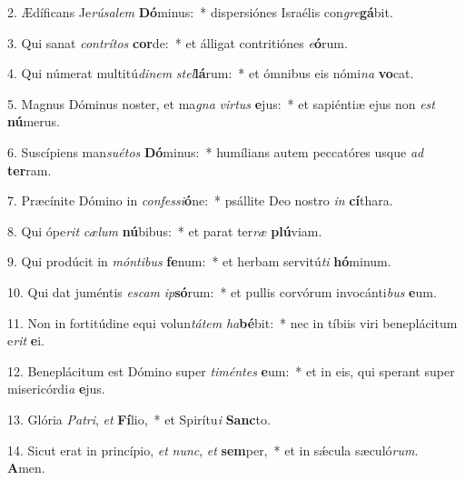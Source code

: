 2. Ædíficans Je\textit{rú}\textit{sa}\textit{lem} \textbf{Dó}minus:~*  dispersiónes Israélis con\textit{gre}\textbf{gá}bit.\

3. Qui sanat \textit{con}\textit{trí}\textit{tos} \textbf{cor}de:~*  et álligat contritiónes \textit{e}\textbf{ó}rum.\

4. Qui númerat multitú\textit{di}\textit{nem} \textit{stel}\textbf{lá}rum:~*  et ómnibus eis nómi\textit{na} \textbf{vo}cat.\

5. Magnus Dóminus noster, et ma\textit{gna} \textit{vir}\textit{tus} \textbf{e}jus:~*  et sapiéntiæ ejus non \textit{est} \textbf{nú}merus.\

6. Suscípiens man\textit{su}\textit{é}\textit{tos} \textbf{Dó}minus:~*  humílians autem peccatóres usque \textit{ad} \textbf{ter}ram.\

7. Præcínite Dómino in \textit{con}\textit{fes}\textit{si}\textbf{ó}ne:~*  psállite Deo nostro \textit{in} \textbf{cí}thara.\

8. Qui ópe\textit{rit} \textit{cæ}\textit{lum} \textbf{nú}bibus:~*  et parat ter\textit{ræ} \textbf{plú}viam.\

9. Qui prodúcit in \textit{món}\textit{ti}\textit{bus} \textbf{fe}num:~*  et herbam servitú\textit{ti} \textbf{hó}minum.\

10. Qui dat juméntis \textit{es}\textit{cam} \textit{ip}\textbf{só}rum:~*  et pullis corvórum invocánti\textit{bus} \textbf{e}um.\

11. Non in fortitúdine equi volun\textit{tá}\textit{tem} \textit{ha}\textbf{bé}bit:~*  nec in tíbiis viri beneplácitum e\textit{rit} \textbf{e}i.\

12. Beneplácitum est Dómino super \textit{ti}\textit{mén}\textit{tes} \textbf{e}um:~*  et in eis, qui sperant super misericórdi\textit{a} \textbf{e}jus.\

13. Glória \textit{Pa}\textit{tri}, \textit{et} \textbf{Fí}lio,~*  et Spirítu\textit{i} \textbf{Sanc}to.\

14. Sicut erat in princípio, \textit{et} \textit{nunc}, \textit{et} \textbf{sem}per,~*  et in sǽcula sæculó\textit{rum}. \textbf{A}men.\

